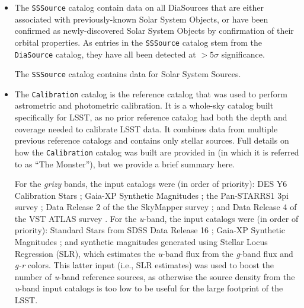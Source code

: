 \begin{itemize}
\item The \texttt{SSSource} catalog contain data on all DiaSources that are either associated with previously-known Solar System Objects, or have been confirmed as newly-discovered Solar System Objects by confirmation of their orbital properties. As entries in the \texttt{SSSource} catalog stem from the \texttt{DiaSource} catalog, they have all been detected at $>5\sigma$ significance. 

The \texttt{SSSource} catalog contains data for \nsolarsystemsources Solar System Sources.



\item The \texttt{Calibration} catalog is the reference catalog that was used to perform astrometric and photometric calibration. It is a whole-sky catalog built specifically for LSST, as no prior reference catalog had both the depth and coverage needed to calibrate LSST data. 
It combines data from multiple previous reference catalogs and contains only stellar sources. 
Full details on how the \texttt{Calibration} catalog was built are provided in \cite{DMTN-277} (in which it is referred to as ``The Monster''), but we provide a brief summary here.

For the \textit{grizy} bands, the input catalogs were (in order of priority): DES Y6 Calibration Stars \citep{2023arXiv230501695R}; Gaia-XP Synthetic Magnitudes \citep{2023A&A...674A..33G}; the Pan-STARRS1 3pi survey \citep{2016arXiv161205560C}; Data Release 2 of the the SkyMapper survey \citep{2019PASA...36...33O}; and Data Release 4 of the VST ATLAS survey \citep{2015MNRAS.451.4238S}. For the \textit{u}-band, the input catalogs were (in order of priority): Standard Stars from SDSS Data Release 16 \citep{2020ApJS..249....3A}; Gaia-XP Synthetic Magnitudes \citep{2023A&A...674A..33G}; and synthetic magnitudes generated using Stellar Locus Regression (SLR), which estimates the \textit{u}-band flux from the \textit{g}-band flux and \textit{g-r} colors. This latter input (i.e., SLR estimates) was used to boost the number of \textit{u}-band reference sources, as otherwise the source density from the \textit{u}-band input catalogs is too low to be useful for the large footprint of the LSST.


\end{itemize}
